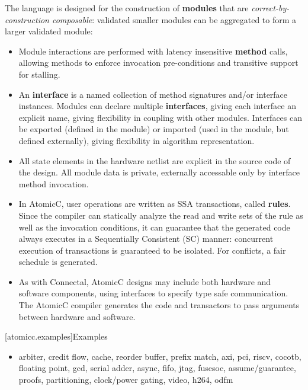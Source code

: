 The language is designed for
the construction of \textbf{modules} that are \textit{correct-by-construction composable}:
validated smaller modules can be aggregated to form
a larger validated module:
\begin{itemize}

\item Module interactions are performed with
latency insensitive
\textbf{method} calls, allowing methods to enforce invocation pre-conditions
and transitive support for stalling.

\item An \textbf{interface} is a named collection of method signatures and/or interface instances.
Modules can declare
multiple \textbf{interfaces}, giving each interface an explicit name,
giving flexibility in coupling with other modules.
Interfaces can be exported (defined in the module) or imported (used in
the module, but defined externally), giving flexibility in algorithm
representation.

\item All state elements in the hardware
netlist are explicit in the source code of the design.
All module data is private, externally accessable only by interface method invocation.

\item In AtomicC, user operations are written as SSA transactions, called \textbf{rules}.  Since the
compiler can statically analyze the read and write sets of the rule as well as the
invocation conditions, it can guarantee that the generated code always executes
in a Sequentially Consistent (SC) manner: concurrent execution of transactions is
guaranteed to be isolated.  For conflicts, a fair schedule is generated.

\item As with Connectal\cite{king2015software}, AtomicC designs may include both hardware and
software components, using interfaces to specify type safe communication.
The AtomicC compiler generates the code and transactors to pass
arguments between hardware and software.

\end{itemize}

[atomicc.examples]{Examples}

\begin{itemize}
\item arbiter,
credit flow,
cache,
reorder buffer,
prefix match,
axi,
pci,
riscv,
cocotb,
floating point,
gcd,
serial adder,
async,
fifo,
jtag,
fusesoc,
assume/guarantee,
proofs,
partitioning,
clock/power gating,
video,
h264,
odfm
\end{itemize}

